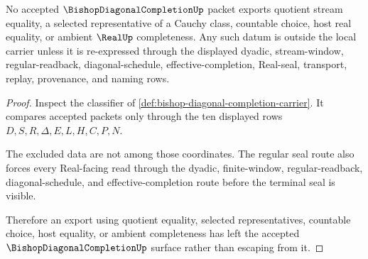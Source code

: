 \begin{theorem}
\label{thm:bishop-diagonal-completion-no-quotient-nonescape}
No accepted $\BishopDiagonalCompletionUp$ packet exports quotient stream equality, a selected representative of a Cauchy class, countable choice, host real equality, or ambient $\RealUp$ completeness. Any such datum is outside the local carrier unless it is re-expressed through the displayed dyadic, stream-window, regular-readback, diagonal-schedule, effective-completion, Real-seal, transport, replay, provenance, and naming rows.
\end{theorem}
\begin{proof}
Inspect the classifier of \autoref{def:bishop-diagonal-completion-carrier}. It compares accepted packets only through the ten displayed rows $D,S,R,\Delta,E,L,H,C,P,N$.

The excluded data are not among those coordinates. The regular seal route also forces every Real-facing read through the dyadic, finite-window, regular-readback, diagonal-schedule, and effective-completion route before the terminal seal is visible.

Therefore an export using quotient equality, selected representatives, countable choice, host equality, or ambient completeness has left the accepted $\BishopDiagonalCompletionUp$ surface rather than escaping from it.
\end{proof}




